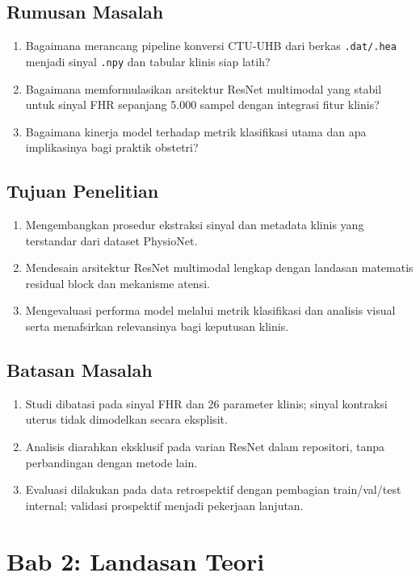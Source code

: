 \documentclass[12pt,a4paper]{article}
\begin{document}
\subsection{Rumusan Masalah}
\begin{enumerate}[label=\alph*)]
    \item Bagaimana merancang pipeline konversi CTU-UHB dari berkas \texttt{.dat/.hea} menjadi sinyal \texttt{.npy} dan tabular klinis siap latih?
    \item Bagaimana memformulasikan arsitektur ResNet multimodal yang stabil untuk sinyal FHR sepanjang 5.000 sampel dengan integrasi fitur klinis?
    \item Bagaimana kinerja model terhadap metrik klasifikasi utama dan apa implikasinya bagi praktik obstetri?
\end{enumerate}

\subsection{Tujuan Penelitian}
\begin{enumerate}[label=\alph*)]
    \item Mengembangkan prosedur ekstraksi sinyal dan metadata klinis yang terstandar dari dataset PhysioNet.
    \item Mendesain arsitektur ResNet multimodal lengkap dengan landasan matematis residual block dan mekanisme atensi.
    \item Mengevaluasi performa model melalui metrik klasifikasi dan analisis visual serta menafsirkan relevansinya bagi keputusan klinis.
\end{enumerate}

\subsection{Batasan Masalah}
\begin{enumerate}[label=\alph*)]
    \item Studi dibatasi pada sinyal FHR dan 26 parameter klinis; sinyal kontraksi uterus tidak dimodelkan secara eksplisit.
    \item Analisis diarahkan eksklusif pada varian ResNet dalam repositori, tanpa perbandingan dengan metode lain.
    \item Evaluasi dilakukan pada data retrospektif dengan pembagian train/val/test internal; validasi prospektif menjadi pekerjaan lanjutan.
\end{enumerate}

\section{Bab 2: Landasan Teori}
\end{document}
